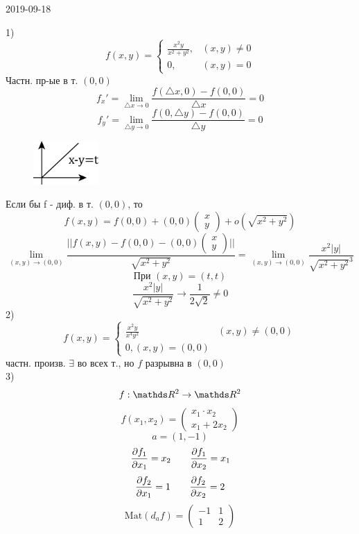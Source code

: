 \documentclass[main]{subfiles}
\begin{document}
\begin{lect} {2019-09-18}
		\begin{example}
			1)
				\[f(x, y) = \begin{cases}
						\frac{x^2 y}{x^2 + y^2}, & (x, y) \neq 0\\
						0, & (x, y) = 0
				\end{cases}\]
				Частн. пр-ые в т. $(0, 0)$
				\[f_x' = \lim_{\triangle x \to 0} \frac{f(\triangle x, 0) - f(0, 0)}{\triangle x} = 0 \]
				\[f_y' = \lim_{\triangle y \to 0} \frac{f(0, \triangle y) - f(0, 0)}{\triangle y} = 0\]
				\begin{figure}[H]
						\includegraphics[width = 2.5cm]{pics/4_1}
						\centering
				\end{figure}
				Если бы f - диф. в т. $(0, 0)$, то
				\[f(x, y) = f(0, 0) + (0, 0) \begin{pmatrix}
					x\\
					y
				\end{pmatrix}
				+ o(\sqrt{x^2 + y^2})
			\]
			\[\lim_{(x, y) \to (0, 0)} \frac{||f(x, y) - f(0, 0) - (0, 0) \begin{pmatrix}
				x\\
				y
			\end{pmatrix}||}{\sqrt{x^2 + y^2}} =
				\lim_{(x, y) \to (0, 0)} \frac{x^2|y|}{ \sqrt{x^2 + y^2}^3} \]
				\[\text{При } (x, y) = (t, t)\]
				\[\frac{x^2|y|}{\sqrt{x^2 + y^2}} \to \frac{1}{2\sqrt{2}} \neq 0\]
				2)
				\[f(x, y) = \begin{cases}
						\frac{x^2 y}{x^4 y^2} & (x, y) \neq (0, 0)\\
						0 , (x, y) = (0, 0)
						\end{cases}\]
				частн. произв. $\exists$ во всех т., но $f$ разрывна в $(0, 0)$\\
				3)
				\[f: \R^2 \to \R^2\]
				\[f(x_1, x_2) = \begin{pmatrix}
					x_1 \cdot x_2\\
					x_1 + 2x_2
				\end{pmatrix}\]
				\[a = (1, -1)\]
				\[\frac{\partial f_1}{\partial x_1} = x_2 \quad\quad \frac{\partial f_1}{\partial x_2} = x_1\]
				\[\frac{\partial f_2}{\partial x_1} = 1 \quad\quad \frac{\partial f_2}{\partial x_2} = 2\]
				\[\text{Mat}(d_a f) = \begin{pmatrix}
					-1 & 1\\
					1 & 2
				\end{pmatrix}\]

\end{example}
\end{lect}
\end{document}
